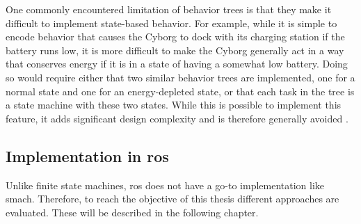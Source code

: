\documentclass[\rootfolder/main.tex]{subfiles}
\begin{document}
One commonly encountered limitation of behavior trees is that they make it difficult to implement state-based behavior.
For example, while it is simple to encode behavior that causes the Cyborg to dock with its charging station if the battery runs low, it is more difficult to make the Cyborg generally act in a way that conserves energy if it is in a state of having a somewhat low battery.
Doing so would require either that two similar behavior trees are implemented, one for a normal state and one for an energy-depleted state, or that each task in the tree is a state machine with these two states.
While this is possible to implement this feature, it adds significant design complexity and is therefore generally avoided \cite{Millington}.


\subsection{Implementation in \acrshort{ros}}

Unlike finite state machines, \acrshort{ros} does not have a go-to implementation like \acrshort{smach}.
Therefore, to reach the objective of this thesis different approaches are evaluated.
These will be described in the following chapter.
\end{document}
